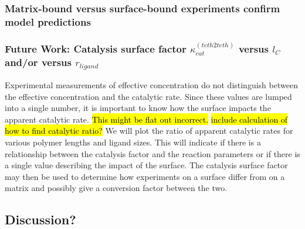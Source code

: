 \documentclass[../../AdvancementSummary.tex]{subfiles}
\begin{document}
\subsubsection{Matrix-bound versus surface-bound experiments confirm model predictions}

\subsubsection{Future Work: Catalysis surface factor $\kappa^{(teth2teth)}_{cat}$ versus $l_C$ and/or versus $r_{ligand}$}

Experimental measurements of effective concentration do not distinguish between the effective concentration and the catalytic rate. Since these values are lumped into a single number, it is important to know how the surface impacts the apparent catalytic rate.  \hl{This might be flat out incorrect.} \hl{ include calculation of how to find catalytic ratio?} We will plot the ratio of apparent catalytic rates for various polymer lengths and ligand sizes. This will indicate if there is a relationship between the catalysis factor and the reaction parameters or if there is a single value describing the impact of the surface. The catalysis surface factor may then be used to determine how experiments on a surface differ from on a matrix and possibly give a conversion factor between the two.

\subsection{Discussion?}









\end{document}
